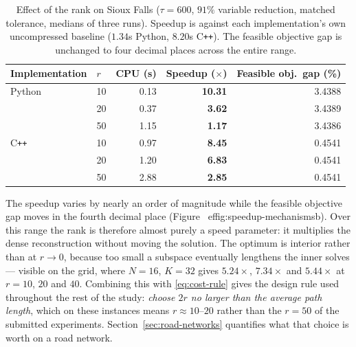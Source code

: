 \documentclass[11pt]{article}
\newif\ifshownotes \shownotesfalse
\newcommand{\conoteY}[1]{\ifshownotes{\color{red}\small\textsf{[Note to Yuchao: #1]}}\fi}
\begin{document}
\begin{table}[h]
\centering
\caption{Effect of the rank on Sioux Falls ($\tau=600$, $91\%$ variable
reduction, matched tolerance, medians of three runs). Speedup is against each
implementation's own uncompressed baseline ($1.34$s Python, $8.20$s C\texttt{++}). The
feasible objective gap is unchanged to four decimal places across the entire range.}
\label{tab:impact-rank}
{\small
\begin{tabular}{llrrr}
\toprule
Implementation & $r$ & CPU (s) & \textbf{Speedup} ($\times$) & Feasible obj.\ gap (\%)\\
\midrule
Python & 10 & 0.13 & \textbf{10.31} & 3.4388\\
       & 20 & 0.37 & \textbf{3.62}  & 3.4389\\
       & 50 & 1.15 & \textbf{1.17}  & 3.4386\\
\midrule
C\texttt{++} & 10 & 0.97 & \textbf{8.45} & 0.4541\\
             & 20 & 1.20 & \textbf{6.83} & 0.4541\\
             & 50 & 2.88 & \textbf{2.85} & 0.4541\\
\bottomrule
\end{tabular}}
\end{table}

The speedup varies by nearly an order of magnitude while the feasible objective gap moves in
the fourth decimal place (Figure~
ef{fig:speedup-mechanisms}b). Over this range the rank is therefore almost purely a speed
parameter: it multiplies the dense reconstruction without moving the solution. The optimum is
interior rather than at $r\to0$, because too small a subspace eventually lengthens the inner
solves --- visible on the grid, where $N=16$, $K=32$ gives $5.24\times$, $7.34\times$ and
$5.44\times$ at $r=10$, $20$ and $40$. Combining this with \eqref{eq:cost-rule} gives the
design rule used throughout the rest of the study: \emph{choose $2r$ no larger than the
average path length}, which on these instances means $r\approx10$--$20$ rather than the
$r=50$ of the submitted experiments. Section~\ref{sec:road-networks} quantifies what that
choice is worth on a road network.

\conoteY{This rule is the direct answer to Referee~2's request for analytical guidance on
$r$, and it is currently the only place we give a parameter rule. He asked the same question
about $\tau$ --- uniform or per-OD, and how it relates to convergence --- and we still choose
$\tau$ by quantile with no argument. If you can supply even a heuristic derivation for $\tau$
analogous to \eqref{eq:cost-rule}, it would close his second objection as cleanly as this
closes the first.}
\end{document}
